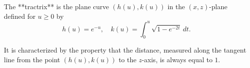 The **tractrix** is the plane curve $(h(u), k(u))$ in the $(x, z)$-plane defined for $u \geq 0$ by
$$h(u) = e^{-u}, \quad k(u) = \int_0^u \sqrt{1 - e^{-2t}} \, dt.$$

It is characterized by the property that the distance, measured along the tangent line from the point $(h(u), k(u))$ to the $z$-axis, is always equal to $1$.
